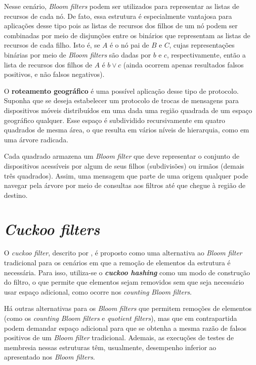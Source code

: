 \documentclass[12pt,twoside,english,brazilian]{article}
\begin{document}
Nesse cenário, \textit{Bloom filters} podem ser utilizados para representar as listas de recursos de cada nó. De fato, essa estrutura é especialmente vantajosa para aplicações desse tipo pois as listas de recursos dos filhos de um nó podem ser combinadas por meio de disjunções entre os binários que representam as listas de recursos de cada filho. Isto é, se $A$ é o nó pai de $B$ e $C$, cujas representações binárias por meio de \textit{Bloom filters} são dadas por $b$ e $c$, respectivamente, então a lista de recursos dos filhos de $A$ é $b \lor c$ (ainda ocorrem apenas resultados falsos positivos, e não falsos negativos).

O \textbf{roteamento geográfico} é uma possível aplicação desse tipo de protocolo. Suponha que se deseja estabelecer um protocolo de trocas de mensagens para dispositivos móveis distribuídos em uma dada uma região quadrada de um espaço geográfico qualquer. Esse espaço é subdividido recursivamente em quatro quadrados de mesma área, o que resulta em vários níveis de hierarquia, como em uma árvore radicada.

Cada quadrado armazena um \textit{Bloom filter} que deve representar o conjunto de dispositivos acessíveis por algum de seus filhos (subdivisões) ou irmãos (demais três quadrados). Assim, uma mensagem que parte de uma origem qualquer pode navegar pela árvore por meio de consultas aos filtros até que chegue à região de destino.

\newpage

\section{\textit{Cuckoo filters}}

O \textit{cuckoo filter}, descrito por \citet{cuckoo}, é proposto como uma alternativa ao \textit{Bloom filter} tradicional para os cenários em que a remoção de elementos da estrutura é necessária. Para isso, utiliza-se o \textbf{\textit{cuckoo hashing}} como um modo de construção do filtro, o que permite que elementos sejam removidos sem que seja necessário usar espaço adicional, como ocorre nos \textit{counting Bloom filters}.

Há outras alternativas para os \textit{Bloom filters} que permitem remoções de elementos (como os \textit{counting Bloom filters} e \textit{quotient filters}), mas que em contrapartida podem demandar espaço adicional para que se obtenha a mesma razão de falsos positivos de um \textit{Bloom filter} tradicional. Ademais, as execuções de testes de membresia nessas estruturas têm, usualmente, desempenho inferior ao apresentado nos \textit{Bloom filters}.
\end{document}
